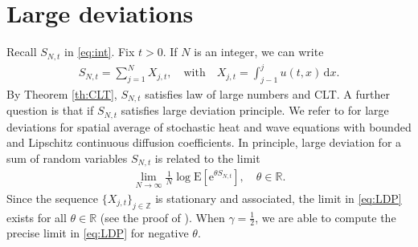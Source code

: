 \documentclass[12pt, reqno]{amsart}
\newcommand{\R}{{\mathbb{R}}}
\newcommand{\Z}{{\mathbb{Z}}}
\newcommand{\E}{\mathrm{E}}
\renewcommand{\d}{\mathrm{d}}
\newcommand{\<}{\langle}
\renewcommand{\>}{\rangle}
\newcommand{\e}{\mathrm{e}}
\begin{document}
\section{Large deviations}\label{sec:LDP}

Recall $S_{N,t}$ in \eqref{eq:int}. Fix $t>0$. If $N$ is an integer, we can write
\begin{align*}
S_{N,t} = \sum_{j=1}^{N}X_{j,t}, \quad \text{with}\quad X_{j,t} = \int_{j-1}^j u(t,x)\, \d x. 
\end{align*}
By Theorem \ref{th:CLT}, $S_{N,t}$ satisfies law of large numbers and CLT. A further question is that if $S_{N,t}$ satisfies large deviation principle. We refer to \cite{Ebi25b} for large deviations for  spatial average of stochastic heat and wave equations with bounded and Lipschitz continuous diffusion coefficients.  In principle, large deviation for a sum of random variables $S_{N,t}$ is related to the limit
\begin{align}\label{eq:LDP}
\lim_{N\to\infty} \frac1N\log \E\left[\e^{\theta S_{N,t}}\right], \quad \theta \in \R.
\end{align}
Since the sequence $\{X_{j,t}\}_{j\in \Z}$ is stationary and associated,  the limit in \eqref{eq:LDP} exists for all $\theta\in \R$ (see the proof of \cite[Theorem 3.16]{Oli12}). When $\gamma=\frac12$, we are able to compute the precise limit in \eqref{eq:LDP}
for negative $\theta$.
\end{document}
